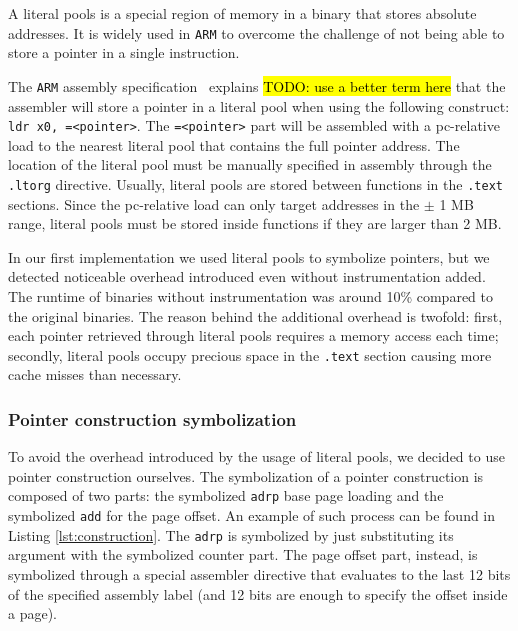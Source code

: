 \documentclass[a4paper,11pt,oneside]{report}
\newcommand{\todo}[1]{%
	\begingroup 
	\sethlcolor{cyan}%
	\hl{TODO: #1}%
	\endgroup
}
\begin{document}
A literal pools is a special region of memory in a binary that stores absolute
addresses. It is widely used in \texttt{ARM} to overcome the challenge of not
being able to store a pointer in a single instruction. 

The \texttt{ARM} assembly specification~\cite{literalpoolsarm} explains
\todo{use a better term here} that the assembler will store a pointer in a
literal pool when using the following construct: \texttt{ldr x0, =<pointer>}.
The \texttt{=<pointer>} part will be assembled with a pc-relative load to the
nearest literal pool that contains the full pointer address.
The location of the literal pool must be manually specified in assembly
through the \texttt{.ltorg} directive. Usually, literal pools are stored
between functions in the \texttt{.text} sections. Since the pc-relative load can only 
target addresses in the $\pm$ 1 MB range, literal pools must be stored 
inside functions if they are larger than 2 MB. 

In our first implementation we used literal pools to symbolize pointers, but we 
detected noticeable overhead introduced even without instrumentation added. The runtime
of binaries without instrumentation was around 10\% compared to the original binaries. 
The reason behind the additional overhead is twofold: first, each pointer retrieved through
literal pools requires a memory access each time; secondly, literal pools occupy precious
space in the \texttt{.text} section causing more cache misses than necessary. 


\subsubsection{Pointer construction symbolization}

To avoid the overhead introduced by the usage of literal pools, we decided to
use pointer construction ourselves. The symbolization of a pointer construction
is composed of two parts: the symbolized \texttt{adrp} base page loading and
the symbolized \texttt{add} for the page offset. An example of such process can
be found in Listing \ref{lst:construction}. The \texttt{adrp} is symbolized by just
substituting its argument with the symbolized counter part.  The page offset part,
instead, is symbolized through a special assembler directive that evaluates to the
last 12 bits of the specified assembly label (and 12 bits are enough to specify
the offset inside a page). 
\end{document}
